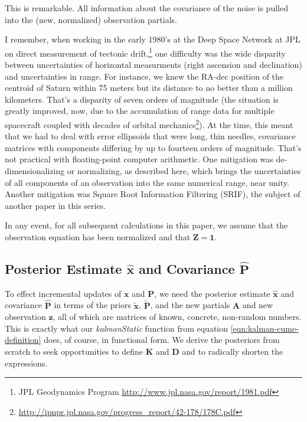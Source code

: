 \documentclass[10pt,oneside,x11names]{article}
\begin{document}
This is remarkable. All information about the covariance of the noise is pulled
into the (new, normalized) observation partials. 

I remember, when working in the early 1980's at the Deep Space Network at JPL on
direct measurement of tectonic drift,\footnote{JPL Geodynamics Program \url{http://www.jpl.nasa.gov/report/1981.pdf}} one difficulty was the wide
disparity between uncertainties of horizontal measurments (right ascension and
declination) and uncertainties in range. For instance, we knew the RA-dec
position of the centroid of Saturn within 75 meters but its distance to no
better than a million kilometers. That's a disparity of seven orders of
magnitude (the situation is greatly improved, now, due to the accumulation of
range data for multiple spacecraft coupled with decades of orbital
mechanics\footnote{\url{http://ipnpr.jpl.nasa.gov/progress_report/42-178/178C.pdf}}). At the time, this meant that we had to deal with error
ellipsoids that were long, thin needles, covariance matrices with components
differing by up to fourteen orders of magnitude. That's not practical with
floating-point computer arithmetic. One mitigation was de-dimensionalizing or
normalizing, as described here, which brings the uncertainties of all components
of an observation into the same numerical range, near unity. Another mitigation
was Square Root Information Filtering (SRIF), the subject of another paper in
this series.

In any event, for all subsequent calculations in this paper, we assume that the
observation equation has been normalized and that \(\mathbold{Z}=\mathbold{1}\). 


\subsection{Posterior Estimate \(\hat{\mathbold{x}}\) and Covariance \(\hat{\mathbold{P}}\)}
\label{sec:orgheadline16}

To effect incremental updates of \(\mathbold{x}\) and \(\mathbold{P}\), we need the
posterior estimate \(\hat{\mathbold{x}}\) and covariance \(\hat{\mathbold{P}}\) in
terms of the priors \(\tilde{\mathbold{x}}\), \(\tilde{\mathbold{P}}\), and the new
partials \(\mathbold{A}\) and new observation \(\mathbold{z}\), all  of which are
matrices of known, concrete, non-random numbers. This is exactly what our
\emph{kalmanStatic} function from equation \ref{eqn:kalman-cume-definition} does, of course,
in functional form.  We derive the posteriors from scratch to seek
opportunities to define \(\mathbold{K}\) and \(\mathbold{D}\) and to radically shorten
the expressions. 
\end{document}
